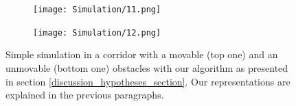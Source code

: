 \begin{figure}[H]
\medskip

\begin{subfigure}{0.48\textwidth}
\texttt{[image: Simulation/11.png]}
\caption{} \label{fig:simulation_11}
\end{subfigure}\hspace*{\fill}
\begin{subfigure}{0.48\textwidth}
\texttt{[image: Simulation/12.png]}
\caption{} \label{fig:simulation_12}
\end{subfigure}

\caption{Simple simulation in a corridor with a movable (top one) and an unmovable (bottom one) obstacles with our algorithm as presented in section \ref{discussion_hypotheses_section}. Our representations are explained in the previous paragraphs.} \label{fig:simulation}
\end{figure}
